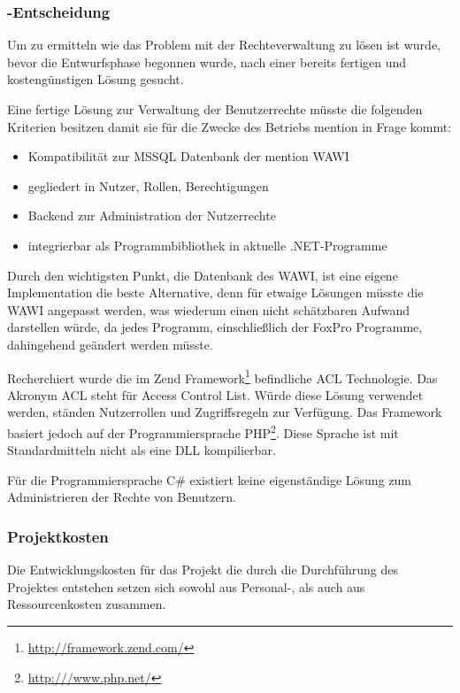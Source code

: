 \subsubsection{-Entscheidung}
\label{sec:MakeOrBuyEntscheidung}
Um zu ermitteln wie das Problem mit der Rechteverwaltung zu lösen ist wurde,
bevor die Entwurfsphase begonnen wurde, nach einer bereits fertigen und kostengünstigen Lösung gesucht.

Eine fertige Lösung zur Verwaltung der Benutzerrechte müsste die folgenden
Kriterien besitzen damit sie für die Zwecke des Betriebs \ac{mention} in Frage
kommt:
\begin{itemize}
	\item Kompatibilität zur \ac{MSSQL} Datenbank der \ac{mention} \ac{WAWI}
	\item gegliedert in Nutzer, Rollen, Berechtigungen
	\item Backend zur Administration der Nutzerrechte
	\item integrierbar als Programmbibliothek in aktuelle .NET-Programme
\end{itemize}

Durch den wichtigsten Punkt, die Datenbank des \acs{WAWI}, ist eine eigene
Implementation die beste Alternative, denn für etwaige Lösungen müsste die
\ac{WAWI} angepasst werden, was wiederum einen nicht schätzbaren Aufwand
darstellen würde, da jedes Programm, einschließlich der FoxPro Programme,
dahingehend geändert werden müsste.

Recherchiert wurde die im Zend
Framework\footnote{\url{http://framework.zend.com/}} befindliche ACL
Technologie. Das Akronym ACL steht für Access Control List. Würde diese Lösung
verwendet werden, ständen Nutzerrollen und Zugriffsregeln zur Verfügung. Das
Framework basiert jedoch auf der Programmiersprache
PHP\footnote{\url{http:///www.php.net/}}. Diese Sprache ist mit Standardmitteln
nicht als eine \ac{DLL} kompilierbar.

Für die Programmiersprache C\# existiert keine eigenständige Lösung zum
Administrieren der Rechte von Benutzern.\\

\subsubsection{Projektkosten}
\label{sec:Projektkosten}

Die Entwicklungskosten für das Projekt die durch die Durchführung des
Projektes entstehen setzen sich sowohl aus Personal-, als auch aus
Ressourcenkosten zusammen.


